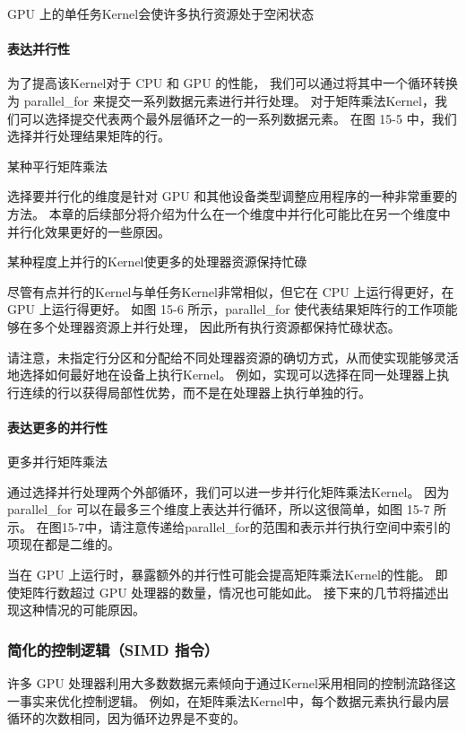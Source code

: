 {\color{red} GPU 上的单任务Kernel会使许多执行资源处于空闲状态}

\paragraph{表达并行性}

为了提高该Kernel对于 CPU 和 GPU 的性能，
我们可以通过将其中一个循环转换为 parallel\_for 来提交一系列数据元素进行并行处理。 
对于矩阵乘法Kernel，我们可以选择提交代表两个最外层循环之一的一系列数据元素。 
在图 15-5 中，我们选择并行处理结果矩阵的行。

{\color{red} 某种平行矩阵乘法}

\begin{remark}[选择如何并行化]
选择要并行化的维度是针对 GPU 和其他设备类型调整应用程序的一种非常重要的方法。
本章的后续部分将介绍为什么在一个维度中并行化可能比在另一个维度中并行化效果更好的一些原因。
\end{remark}

{\color{red} 某种程度上并行的Kernel使更多的处理器资源保持忙碌}

尽管有点并行的Kernel与单任务Kernel非常相似，但它在 CPU 上运行得更好，在 GPU 上运行得更好。 
如图 15-6 所示，parallel\_for 使代表结果矩阵行的工作项能够在多个处理器资源上并行处理，
因此所有执行资源都保持忙碌状态。

请注意，未指定行分区和分配给不同处理器资源的确切方式，从而使实现能够灵活地选择如何最好地在设备上执行Kernel。 
例如，实现可以选择在同一处理器上执行连续的行以获得局部性优势，而不是在处理器上执行单独的行。

\paragraph{表达更多的并行性}

{\color{red} 更多并行矩阵乘法}

通过选择并行处理两个外部循环，我们可以进一步并行化矩阵乘法Kernel。 
因为 parallel\_for 可以在最多三个维度上表达并行循环，所以这很简单，如图 15-7 所示。 
在图15-7中，请注意传递给parallel\_for的范围和表示并行执行空间中索引的项现在都是二维的。

当在 GPU 上运行时，暴露额外的并行性可能会提高矩阵乘法Kernel的性能。 
即使矩阵行数超过 GPU 处理器的数量，情况也可能如此。 接下来的几节将描述出现这种情况的可能原因。

\subsubsection{简化的控制逻辑（SIMD 指令）}
许多 GPU 处理器利用大多数数据元素倾向于通过Kernel采用相同的控制流路径这一事实来优化控制逻辑。 
例如，在矩阵乘法Kernel中，每个数据元素执行最内层循环的次数相同，因为循环边界是不变的。

